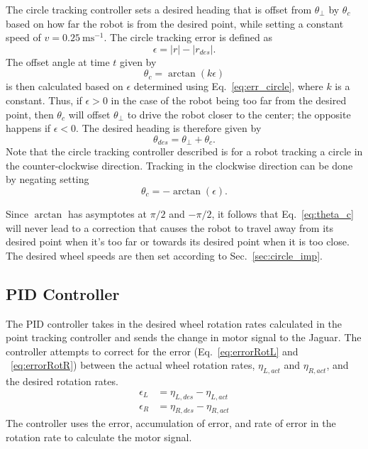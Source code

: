 \documentclass[conference]{../IEEEtran}
\begin{document}
The circle tracking controller sets a desired heading that is offset from $\theta_{\perp}$
by $\theta_{c}$ based on how far the robot is from the desired point, while setting a
constant speed of $v = \SI{0.25}{\m \s^{-1}}$. The circle tracking error is defined as
\begin{equation}
  \epsilon = |r| - |r_{des}|.
  \label{eq:err_circle}
\end{equation}
The offset angle at time $t$ given by
\begin{equation}
  \theta_c = \arctan(k\epsilon)
  \label{eq:theta_c}
\end{equation}
is then calculated based on $\epsilon$ determined using Eq.~\ref{eq:err_circle}, where $k$
is a constant.  Thus, if $\epsilon > 0$ in the case of the robot being too far from the
desired point, then $\theta_c$ will offset $\theta_{\perp}$ to drive the robot closer to
the center; the opposite happens if $\epsilon < 0$.  The desired heading is therefore
given by
\begin{equation}
  \theta_{des} = \theta_{\perp} + \theta_c.
  \label{eq:theta_des}
\end{equation}
Note that the circle tracking controller described is for a robot tracking a circle in the
counter-clockwise direction. Tracking in the clockwise direction can be done by negating
setting
\begin{equation}
  \theta_c = -\arctan(\epsilon).
\end{equation}

Since $\arctan$ has asymptotes at $\pi/2$ and $-\pi/2$, it follows that
Eq.~\ref{eq:theta_c} will never lead to a correction that causes the robot to travel away
from its desired point when it's too far or towards its desired point when it is too
close. The desired wheel speeds are then set according to Sec.~\ref{sec:circle_imp}.


\subsection{PID Controller} \label{sec:pid_theo}
The PID controller takes in the desired wheel rotation rates calculated in the point
tracking controller and sends the change in motor signal to the Jaguar. The controller
attempts to correct for the error (Eq.~\ref{eq:errorRotL} and ~\ref{eq:errorRotR}) between
the actual wheel rotation rates, $\eta_{L,act}$ and $\eta_{R,act}$, and the desired
rotation rates. 
\begin{align}
\epsilon_{L} &= \eta_{L,des}-\eta_{L,act}
\label{eq:errorRotL}\\
\epsilon_{R} &= \eta_{R,des}-\eta_{R,act}
\label{eq:errorRotR}
\end{align}
The controller uses the error, accumulation of error, and rate of error in the rotation
rate to calculate the motor signal.
\end{document}
